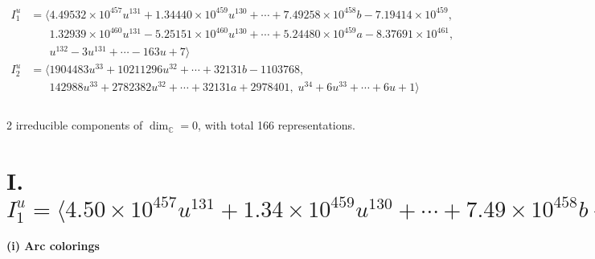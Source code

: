 \documentclass[1p]{elsarticle_modified}
\theoremstyle{definition}
\begin{document}
\begin{align*}
I^u_{1}&=\langle 
4.49532\times10^{457} u^{131}+1.34440\times10^{459} u^{130}+\cdots+7.49258\times10^{458} b-7.19414\times10^{459},\\
\phantom{I^u_{1}}&\phantom{= \langle  }1.32939\times10^{460} u^{131}-5.25151\times10^{460} u^{130}+\cdots+5.24480\times10^{459} a-8.37691\times10^{461},\\
\phantom{I^u_{1}}&\phantom{= \langle  }u^{132}-3 u^{131}+\cdots-163 u+7\rangle \\
I^u_{2}&=\langle 
1904483 u^{33}+10211296 u^{32}+\cdots+32131 b-1103768,\\
\phantom{I^u_{2}}&\phantom{= \langle  }142988 u^{33}+2782382 u^{32}+\cdots+32131 a+2978401,\;u^{34}+6 u^{33}+\cdots+6 u+1\rangle \\
\\
\end{align*}
\raggedright * 2 irreducible components of $\dim_{\mathbb{C}}=0$, with total 166 representations.\\
\newpage
\renewcommand{\arraystretch}{1}
\centering \section*{I. $I^u_{1}= \langle 4.50\times10^{457} u^{131}+1.34\times10^{459} u^{130}+\cdots+7.49\times10^{458} b-7.19\times10^{459},\;1.33\times10^{460} u^{131}-5.25\times10^{460} u^{130}+\cdots+5.24\times10^{459} a-8.38\times10^{461},\;u^{132}-3 u^{131}+\cdots-163 u+7 \rangle$}
\flushleft \textbf{(i) Arc colorings}\\
\end{document}
